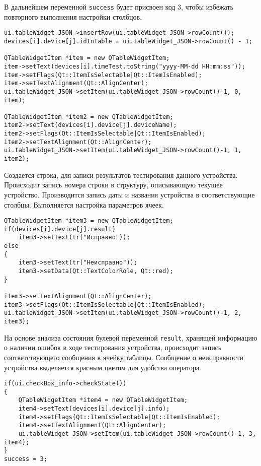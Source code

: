 В дальнейшем переменной \texttt{success} будет присвоен код 3, чтобы избежать повторного выполнения настройки столбцов.
\medskip
\begin{verbatim}
ui.tableWidget_JSON->insertRow(ui.tableWidget_JSON->rowCount());
devices[i].device[j].idInTable = ui.tableWidget_JSON->rowCount() - 1;

QTableWidgetItem *item = new QTableWidgetItem;
item->setText(devices[i].timeTest.toString("yyyy-MM-dd HH:mm:ss"));
item->setFlags(Qt::ItemIsSelectable|Qt::ItemIsEnabled);
item->setTextAlignment(Qt::AlignCenter);
ui.tableWidget_JSON->setItem(ui.tableWidget_JSON->rowCount()-1, 0, item);

QTableWidgetItem *item2 = new QTableWidgetItem;
item2->setText(devices[i].device[j].deviceName);
item2->setFlags(Qt::ItemIsSelectable|Qt::ItemIsEnabled);
item2->setTextAlignment(Qt::AlignCenter);
ui.tableWidget_JSON->setItem(ui.tableWidget_JSON->rowCount()-1, 1, item2);
\end{verbatim}
\medskip

Создается строка, для записи результатов тестирования данного устройства. Происходит запись номера строки в структуру,
описывающую текущее устройство. Производится запись даты и названия устройства в соответствующие столбцы. Выполняется
настройка параметров ячеек.

\medskip
\begin{verbatim}
QTableWidgetItem *item3 = new QTableWidgetItem;
if(devices[i].device[j].result)
	item3->setText(tr("Исправно"));
else
{
	item3->setText(tr("Неисправно"));
	item3->setData(Qt::TextColorRole, Qt::red);
}

item3->setTextAlignment(Qt::AlignCenter);
item3->setFlags(Qt::ItemIsSelectable|Qt::ItemIsEnabled);
ui.tableWidget_JSON->setItem(ui.tableWidget_JSON->rowCount()-1, 2, item3);
\end{verbatim}
\medskip

На основе анализа состояния булевой переменной \texttt{result}, хранящей информацию о наличии ошибок в ходе тестирования
устройства, происходит запись соответствующего сообщения в ячейку таблицы. Сообщение о неисправности устройства
выделяется красным цветом для удобства оператора.

\medskip
\begin{verbatim}
if(ui.checkBox_info->checkState())
{
	QTableWidgetItem *item4 = new QTableWidgetItem;
	item4->setText(devices[i].device[j].info);
	item4->setFlags(Qt::ItemIsSelectable|Qt::ItemIsEnabled);
	item4->setTextAlignment(Qt::AlignCenter);
	ui.tableWidget_JSON->setItem(ui.tableWidget_JSON->rowCount()-1, 3, item4);
}
success = 3;
\end{verbatim}
\medskip

